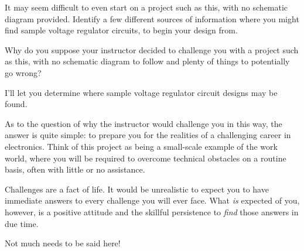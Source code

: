 

It may seem difficult to even start on a project such as this, with no schematic diagram provided.  Identify a few different sources of information where you might find sample voltage regulator circuits, to begin your design from.

Why do you suppose your instructor decided to challenge you with a project such as this, with no schematic diagram to follow and plenty of things to potentially go wrong?







I'll let you determine where sample voltage regulator circuit designs may be found.

\vskip 10pt

As to the question of why the instructor would challenge you in this way, the answer is quite simple: to prepare you for the realities of a challenging career in electronics.  Think of this project as being a small-scale example of the work world, where you will be required to overcome technical obstacles on a routine basis, often with little or no assistance.

Challenges are a fact of life.  It would be unrealistic to expect you to have immediate answers to every challenge you will ever face.  What {\it is} expected of you, however, is a positive attitude and the skillful persistence to {\it find} those answers in due time.







Not much needs to be said here!



